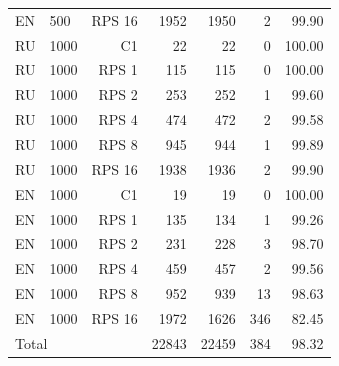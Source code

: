 \begin{singlespace}
\begin{longtable}{@{}llrrrrr@{}}
EN & 500 & RPS 16 & 1952 & 1950 & 2 & 99.90 \\
RU & 1000 & C1 & 22 & 22 & 0 & 100.00 \\
RU & 1000 & RPS 1 & 115 & 115 & 0 & 100.00 \\
RU & 1000 & RPS 2 & 253 & 252 & 1 & 99.60 \\
RU & 1000 & RPS 4 & 474 & 472 & 2 & 99.58 \\
RU & 1000 & RPS 8 & 945 & 944 & 1 & 99.89 \\
RU & 1000 & RPS 16 & 1938 & 1936 & 2 & 99.90 \\
EN & 1000 & C1 & 19 & 19 & 0 & 100.00 \\
EN & 1000 & RPS 1 & 135 & 134 & 1 & 99.26 \\
EN & 1000 & RPS 2 & 231 & 228 & 3 & 98.70 \\
EN & 1000 & RPS 4 & 459 & 457 & 2 & 99.56 \\
EN & 1000 & RPS 8 & 952 & 939 & 13 & 98.63 \\
EN & 1000 & RPS 16 & 1972 & 1626 & 346 & 82.45 \\
\midrule
\multicolumn{3}{l}{Total} & 22843 & 22459 & 384 & 98.32 \\
\end{longtable}
\end{singlespace}
